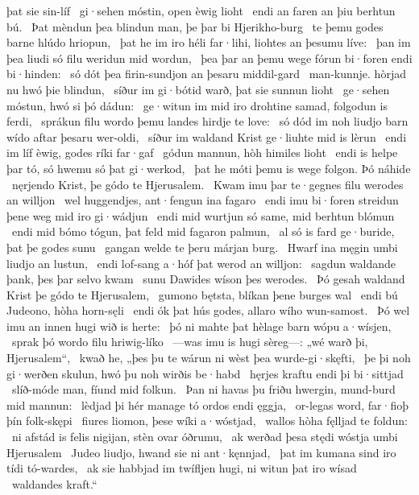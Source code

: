 þat sie sin-líf \hld\ gi·sehen móstin,
open èwig lioht \hld\ endi an faren
an þiu berhtun bú. \hld\ Þat mèndun þea blindun man,
þe þar bi Hjerikho-burg \hld\ te þemu godes barne
hlúdo hriopun, \hld\ þat he im iro héli far·lihi,
liohtes an þesumu líve: \hld\ þan im þea liudi só filu
weridun mid wordun, \hld\ þea þar an þemu wege fórun
bi·foren endi bi·hinden: \hld\ só dót þea firin-sundjon
an þesaru middil-gard \hld\ man-kunnje.
hòrjad nu hwó þie blindun, \hld\ síður im gi·bótid warð,
þat sie sunnun lioht \hld\ ge·sehen móstun,
hwó si þó dádun: \hld\ ge·witun im mid iro drohtine samad,
folgodun is ferdi, \hld\ sprákun filu wordo
þemu landes hirdje te love: \hld\ só dód im noh liudjo barn
wído aftar þesaru wer-oldi, \hld\ síður im waldand Krist
ge·liuhte mid is lèrun \hld\ endi im líf èwig,
godes ríki far·gaf \hld\ gódun mannun,
hòh himiles lioht \hld\ endi is helpe þar tó,
só hwemu só þat gi·werkod, \hld\ þat he móti þemu is wege folgon.
Þó náhide \hld\ nęrjendo Krist,
þe gódo te Hjerusalem. \hld\ Kwam imu þar te·gegnes filu
werodes an willjon \hld\ wel huggendjes,
ant·fengun ina fagaro \hld\ endi imu bi·foren streidun
þene weg mid iro gi·wádjun \hld\ endi mid wurtjun só same,
mid berhtun blómun \hld\ endi mid bómo tógun,
þat feld mid fagaron palmun, \hld\ al só is fard ge·buride,
þat þe godes sunu \hld\ gangan welde
te þeru márjan burg. \hld\ Hwarf ina męgin umbi
liudjo an lustun, \hld\ endi lof-sang a·hóf
þat werod an willjon: \hld\ sagdun waldande þank,
þes þar selvo kwam \hld\ sunu Dawides
wíson þes werodes. \hld\ Þó gesah waldand Krist
þe gódo te Hjerusalem, \hld\ gumono bętsta,
blíkan þene burges wal \hld\ endi bú Judeono,
hòha horn-sęli \hld\ endi ók þat hús godes,
allaro wího wun-samost. \hld\ Þó wel imu an innen
hugi wið is herte: \hld\ þó ni mahte þat hèlage barn
wópu a·wísjen, \hld\ sprak þó wordo filu
hriwig-líko \hld\ —was imu is hugi sèreg—:
„wé warð þi, Hjerusalem“, \hld\ kwað he, „þes þu te wárun ni wèst
þea wurde-gi·skęfti, \hld\ þe þi noh gi·werðen skulun,
hwó þu noh wirðis be·habd \hld\ hęrjes kraftu
endi þi bi·sittjad \hld\ slíð-móde man,
fíund mid folkun. \hld\ Þan ni havas þu friðu hwergin,
mund-burd mid mannun: \hld\ lèdjad þi hér manage tó
ordos endi ęggja, \hld\ or-legas word,
far·fioþ þín folk-skępi \hld\ fiures liomon,
þese wíki a·wóstjad, \hld\ wallos hòha
fęlljad te foldun: \hld\ ni afstád is felis nigijan,
stèn ovar óðrumu, \hld\ ak werðad þesa stędi wóstja
umbi Hjerusalem \hld\ Judeo liudjo,
hwand sie ni ant·kęnnjad, \hld\ þat im kumana sind
iro tídi tó-wardes, \hld\ ak sie habbjad im twífljen hugi,
ni witun þat iro wísad \hld\ waldandes kraft.“
